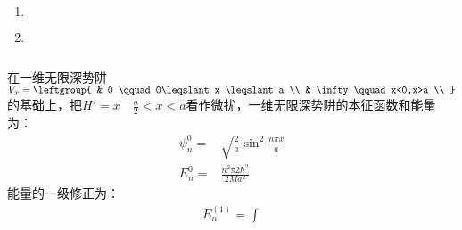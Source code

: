 \subsection{ }
\begin{enumerate}
\item 
\begin{equation}
\begin{aligned}
\end{aligned}
\end{equation}
\item 
\begin{equation}
\begin{aligned}
\end{aligned}
\end{equation}

\end{enumerate}

\subsection{ }
在一维无限深势阱$V_{x} = \leftgroup{
    & 0 \qquad 0\leqslant x \leqslant a \\
    & \infty \qquad x<0,x>a \\
}$的基础上，把$H' = x \quad \frac{a}{2} < x < a $看作微扰，一维无限深势阱的本征函数和能量为：\\
\begin{align}
\psi^{0}_{n}=& \sqrt{\frac{2}{a}} \sin^2{\frac{n\pi x}{a}}\\
E^{0}_{n}=& \frac{n^{2}\pi{2}\hbar^{2}}{2Ma^2}
\end{align}
能量的一级修正为：\\
\begin{align}
E^{(1)}_{n}=\int
\end{align}

